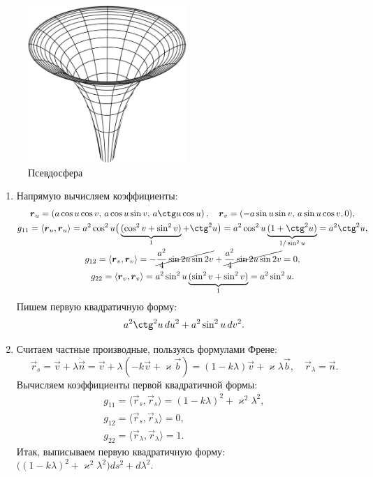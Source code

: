 \begin{figure}[H]
	\centering
	\includegraphics[width=6cm]{./img/Pseudosphere.pdf}
	\caption{Псевдосфера}
\end{figure}

\begin{solution}
	\begin{enumerate}[nolistsep, label=(\arabic*)]
		\item Напрямую вычисляем коэффициенты\footnotemark:
			\begin{gather*}
				\vec{r}_u = \br{a\cos u\cos v,\,a\cos u\sin v,\,a\ctg u\cos u},\quad \vec{r}_v = (-a\sin u\sin v,\,a\sin u\cos v, 0),\\
				g_{11} = \langle\vec{r}_u, \vec{r}_u\rangle = a^2\cos^2u\big(\underbrace{(\cos^2v + \sin^2v)}_1 + \ctg^2u\big) = a^2\cos^2u\underbrace{(1 + \ctg^2u)}_{1 / \sin^2u} = a^2\ctg^2u,\\
				g_{12} = \langle\vec{r}_v, \vec{r}_v\rangle = -\cancel{\frac{a^2}{4}\sin2u\sin2v} + \cancel{\frac{a^2}{4}\sin2u\sin2v} = 0,\\
				g_{22} = \langle\vec{r}_v, \vec{r}_v\rangle = a^2\sin^2u\underbrace{(\sin^2v + \sin^2v)}_1 = a^2\sin^2u.
			\end{gather*}%
			Пишем первую квадратичную форму:
			\[
				a^2\ctg^2u\,du^2 + a^2\sin^2u\,dv^2.
			\]
		\item Считаем частные производные, пользуясь формулами Френе:
			\[
				\vec{r}_s = \vec{v} + \lambda\dot{\vec{n}} = \vec{v} + \lambda(-k\vec{v} + \varkappa\vec{b}) = (1 - k\lambda)\vec{v} + \varkappa\lambda\vec{b},\quad \vec{r}_\lambda = \vec{n}.
			\]
			Вычисляем коэффициенты первой квадратичной формы:
			\begin{gather*}
				g_{11} = \langle\vec{r}_s, \vec{r}_s\rangle = (1 - k\lambda)^2 + \varkappa^2\lambda^2,\\
				g_{12} = \langle\vec{r}_s, \vec{r}_\lambda\rangle = 0,\\
				g_{22} = \langle\vec{r}_\lambda, \vec{r}_\lambda\rangle = 1.
			\end{gather*}
			Итак, выписываем первую квадратичную форму:
			$\big((1 - k\lambda)^2 + \varkappa^2\lambda^2\big)ds^2 + d\lambda^2$.
	\end{enumerate}
\end{solution}

